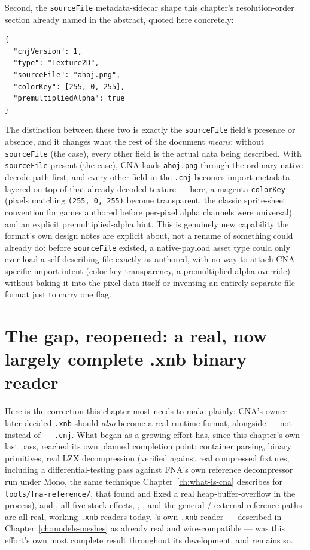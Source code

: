 Second, the \texttt{sourceFile} metadata-sidecar shape this chapter's resolution-order section
already named in the abstract, quoted here concretely:

\begin{lstlisting}
{
  "cnjVersion": 1,
  "type": "Texture2D",
  "sourceFile": "ahoj.png",
  "colorKey": [255, 0, 255],
  "premultipliedAlpha": true
}
\end{lstlisting}

The distinction between these two is exactly the \texttt{sourceFile} field's presence or
absence, and it changes what the rest of the document \emph{means}: without \texttt{sourceFile}
(the  case), every other field is the actual data being described. With
\texttt{sourceFile} present (the  case), CNA loads \texttt{ahoj.png}
through the ordinary native-decode path first, and every other field in the \texttt{.cnj}
becomes import metadata layered on top of that already-decoded texture --- here, a magenta
\texttt{colorKey} (pixels matching \texttt{(255, 0, 255)} become transparent, the classic
sprite-sheet convention for games authored before per-pixel alpha channels were universal) and
an explicit premultiplied-alpha hint. This is genuinely new capability the format's own design
notes are explicit about, not a rename of something  could already do:
before \texttt{sourceFile} existed, a native-payload asset type could only ever load a
self-describing file exactly as authored, with no way to attach CNA-specific import intent
(color-key transparency, a premultiplied-alpha override) without baking it into the pixel data
itself or inventing an entirely separate file format just to carry one flag.

\section{The gap, reopened: a real, now largely complete .xnb binary reader}
\label{sec:xnb-and-cnj-model}

Here is the correction this chapter most needs to make plainly: CNA's owner later decided
\texttt{.xnb} should \emph{also} become a real runtime format, alongside --- not instead of
--- \texttt{.cnj}. What began as a growing effort has, since this chapter's own last pass,
reached its own planned completion point: container parsing, binary primitives, real LZX
decompression (verified against real compressed fixtures, including a differential-testing
pass against FNA's own reference decompressor run under Mono, the same technique
Chapter~\ref{ch:what-is-cna} describes for \texttt{tools/fna-reference/}, that found and fixed
a real heap-buffer-overflow in the process), and , all five stock
effects, , , and the general
/ external-reference paths are all real, working \texttt{.xnb} readers
today. 's own \texttt{.xnb} reader --- described in
Chapter~\ref{ch:models-meshes} as already real and wire-compatible --- was this effort's own
most complete result throughout its development, and remains so.

